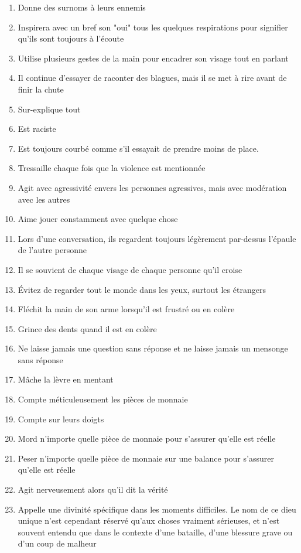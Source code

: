 \documentclass{article}
\begin{document}
\begin{multicols}{2}
\begin{enumerate}
		\item Donne des surnoms à leurs ennemis
		\item Inspirera avec un bref son "oui" tous les quelques respirations pour signifier qu'ils sont toujours à l'écoute
		\item Utilise plusieurs gestes de la main pour encadrer son visage tout en parlant
		\item Il continue d'essayer de raconter des blagues, mais il se met à rire avant de finir la chute
		\item Sur-explique tout
		\item Est raciste 
		\item Est toujours courbé comme s'il essayait de prendre moins de place.
		\item Tressaille chaque fois que la violence est mentionnée
		\item Agit avec agressivité envers les personnes agressives, mais avec modération avec les autres
		\item Aime jouer constamment avec quelque chose
		\item Lors d'une conversation, ils regardent toujours légèrement par-dessus l'épaule de l'autre personne
		\item Il se souvient de chaque visage de chaque personne qu'il croise
		\item Évitez de regarder tout le monde dans les yeux, surtout les étrangers
		\item Fléchit la main de son arme lorsqu'il est frustré ou en colère
		\item Grince des dents quand il est en colère
		\item Ne laisse jamais une question sans réponse et ne laisse jamais un mensonge sans réponse
		\item Mâche la lèvre en mentant
		\item Compte méticuleusement les pièces de monnaie
		\item Compte sur leurs doigts
		\item Mord n'importe quelle pièce de monnaie pour s'assurer qu'elle est réelle
		\item Peser n'importe quelle pièce de monnaie sur une balance pour s'assurer qu'elle est réelle
		\item Agit nerveusement alors qu'il dit la vérité
		\item Appelle une divinité spécifique dans les moments difficiles. Le nom de ce dieu unique n'est cependant réservé qu'aux choses vraiment sérieuses, et n'est souvent entendu que dans le contexte d'une bataille, d'une blessure grave ou d'un coup de malheur

\end{enumerate}
\end{multicols}
\end{document}
